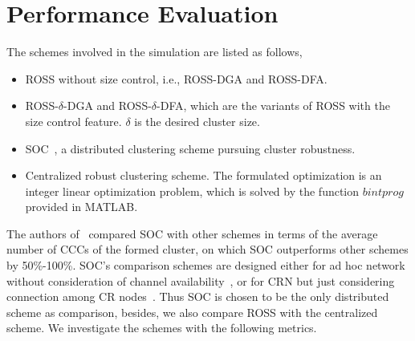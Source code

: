 \documentclass[10pt,journal,compsoc]{IEEEtran}
\theoremstyle{mytheoremstyle}
\theoremstyle{mytheoremstyle}
\theoremstyle{mytheoremstyle}
\newcommand{\ie}{i.e., }
\begin{document}
\section{Performance Evaluation}
\label{performance}
The schemes involved in the simulation are listed as follows,
\begin{itemize}
\item ROSS without size control, \ie ROSS-DGA and ROSS-DFA.
\item ROSS-$\delta$-DGA and ROSS-$\delta$-DFA, which are the variants of ROSS with the size control feature.
$\delta$ is the desired cluster size.
\item SOC~\cite{LIU_TMC11_2}, a distributed clustering scheme pursuing cluster robustness.
\item Centralized robust clustering scheme. 
The formulated optimization is an integer linear optimization problem, which is solved by the function $bintprog$ provided in MATLAB.
\end{itemize}
The authors of~\cite{LIU_TMC11_2} compared SOC with other schemes in terms of the average number of CCCs of the formed cluster, on which SOC outperforms other schemes by 50\%-100\%. 
SOC's comparison schemes are designed either for ad hoc network without consideration of channel availability~\cite{Basagni99}, or for CRN but just considering connection among CR nodes~\cite{Zhao07}. 
Thus SOC is chosen to be the only distributed scheme as comparison, besides, we also compare ROSS with the centralized scheme.
%
We investigate the schemes with the following metrics.
\end{document}
